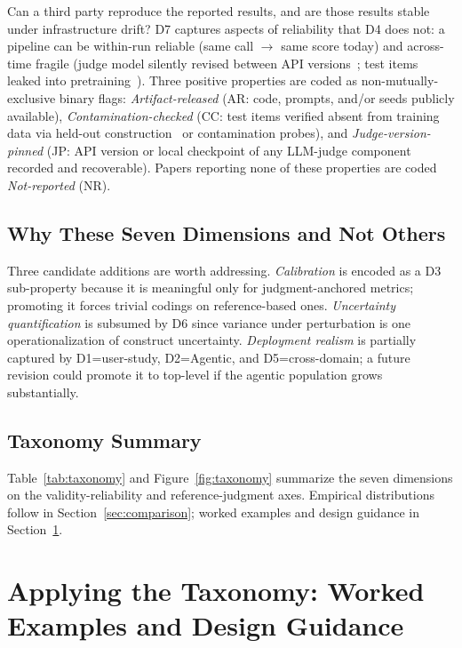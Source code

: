 \documentclass[acmsmall, nonacm, screen]{acmart}
\begin{document}
Can a third party reproduce the reported results, and are those
results stable under infrastructure drift? D7 captures aspects of
reliability that D4 does not: a pipeline can be within-run reliable
(same call $\rightarrow$ same score today) and across-time fragile
(judge model silently revised between API
versions~\cite{feng2025sage}; test items leaked into
pretraining~\cite{ni2025benchmarks, raji2021ai}). Three positive properties are coded as non-mutually-exclusive binary
flags:
\emph{Artifact-released} (AR: code, prompts, and/or seeds publicly
available),
\emph{Contamination-checked} (CC: test items verified absent from
training data via held-out construction~\cite{wildbench2024} or
contamination probes), and
\emph{Judge-version-pinned} (JP: API version or local checkpoint of
any LLM-judge component recorded and recoverable). Papers reporting
none of these properties are coded \emph{Not-reported} (NR).

\subsection{Why These Seven Dimensions and Not Others}
\label{subsec:whyseven}

Three candidate additions are worth addressing. \emph{Calibration}
is encoded as a D3 sub-property because it is meaningful only for
judgment-anchored metrics; promoting it forces trivial codings on
reference-based ones. \emph{Uncertainty quantification} is subsumed
by D6 since variance under perturbation is one operationalization of
construct uncertainty. \emph{Deployment realism} is partially
captured by D1=user-study, D2=Agentic, and D5=cross-domain; a future
revision could promote it to top-level if the agentic population
grows substantially.

\subsection{Taxonomy Summary}
\label{subsec:taxsummary}

Table~\ref{tab:taxonomy} and Figure~\ref{fig:taxonomy} summarize the
seven dimensions on the validity-reliability and reference-judgment
axes. Empirical distributions follow in Section~\ref{sec:comparison};
worked examples and design guidance in
Section~\ref{sec:taxonomy_application}.

\section{Applying the Taxonomy: Worked Examples and Design Guidance}
\label{sec:taxonomy_application}
\end{document}
